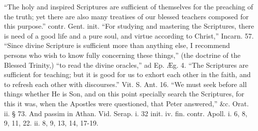 ``The
holy and inspired Scriptures are sufficient of themselves for the
preaching of the truth; yet there are also many treatises of our
blessed teachers composed for this purpose.'' contr. Gent. init. ``For
studying and mastering the Scriptures, there is need of a good life
and a pure soul, and virtue according to Christ,'' Incarn. 57. ``Since
divine Scripture is sufficient more than anything else, I recommend
persons who wish to know fully concerning these things,'' (the doctrine
of the Blessed Trinity,) ``to read the divine oracles,'' ad Ep. Æg. 4. ``The
Scriptures are sufficient for teaching; but it is good for us to
exhort each other in the faith, and to refresh each other with
discourses.'' Vit. S. Ant. 16. ``We must seek before all things
whether He is Son, and on this point specially search the Scriptures,
for this it was, when the Apostles were questioned, that Peter
answered,'' \&c. Orat. ii. § 73. And passim in Athan. Vid. Serap. i.
32 init. iv. fin. contr. Apoll. i. 6, 8, 9, 11, 22. ii. 8, 9, 13, 14,
17-19.

